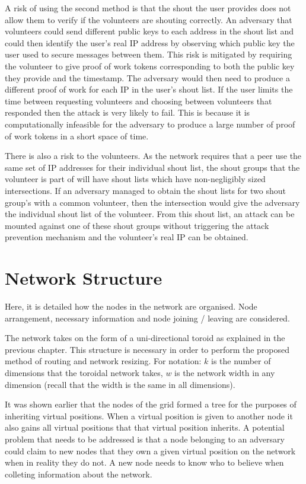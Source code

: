 \documentclass[ %
                    author={Luke Murray},
                supervisor={Dr. Simon Hollis},
                     title={Shadow Peer-to-Peer Networks},
                  subtitle={},
                    degree={MEng},
                      year={2013} ]{thesis}
\begin{document}
A risk of using the second method is that the shout the user provides does not allow them to verify if the volunteers are shouting correctly. An adversary that volunteers could send different public keys to each address in the shout list and could then identify the user's real IP address by observing which public key the user used to secure messages between them. This risk is mitigated by requiring the volunteer to give proof of work tokens corresponding to both the public key they provide and the timestamp. The adversary would then need to produce a different proof of work for each IP in the user's shout list. If the user limits the time between requesting volunteers and choosing between volunteers that responded then the attack is very likely to fail. This is because it is computationally infeasible for the adversary to produce a large number of proof of work tokens in a short space of time.

There is also a risk to the volunteers. As the network requires that a peer use the same set of IP addresses for their individual shout list, the shout groups that the volunteer is part of will have shout lists which have non-negligibly sized intersections. If an adversary managed to obtain the shout lists for two shout group's with a common volunteer, then the intersection would give the adversary the individual shout list of the volunteer. From this shout list, an attack can be mounted against one of these shout groups without triggering the attack prevention mechanism and the volunteer's real IP can be obtained.

\section{Network Structure}

Here, it is detailed how the nodes in the network are organised. Node arrangement, necessary information and node joining / leaving are considered.

The network takes on the form of a uni-directional toroid as explained in the previous chapter. This structure is necessary in order to perform the proposed method of routing and network resizing. For notation: $k$ is the number of dimensions that the toroidal network takes, $w$ is the network width in any dimension (recall that the width is the same in all dimensions).

It was shown earlier that the nodes of the grid formed a tree for the purposes of inheriting virtual positions. When a virtual position is given to another node it also gains all virtual positions that that virtual position inherits. A potential problem that needs to be addressed is that a node belonging to an adversary could claim to new nodes that they own a given virtual position on the network when in reality they do not. A new node needs to know who to believe when colleting information about the network.
\end{document}
